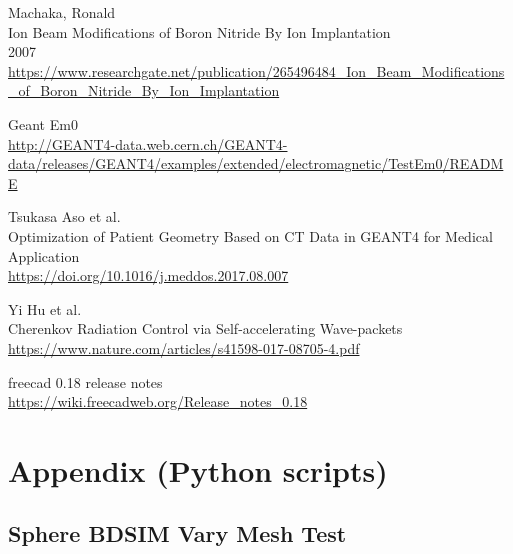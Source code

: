 \documentclass[12pt,a4paper]{article}
\begin{document}
\begin{thebibliography}{1}
	Machaka, Ronald\\
	Ion Beam Modifications of Boron Nitride By Ion Implantation\\
	2007\\
	\url{https://www.researchgate.net/publication/265496484_Ion_Beam_Modifications_of_Boron_Nitride_By_Ion_Implantation}
	
	Geant Em0\\
	\url{http://GEANT4-data.web.cern.ch/GEANT4-data/releases/GEANT4/examples/extended/electromagnetic/TestEm0/README}

	Tsukasa Aso et al.\\
	Optimization of Patient Geometry Based on CT Data in GEANT4 for Medical Application\\
	\url{https://doi.org/10.1016/j.meddos.2017.08.007}

	Yi Hu et al.\\
	Cherenkov Radiation Control via Self-accelerating Wave-packets\\
	\url{https://www.nature.com/articles/s41598-017-08705-4.pdf}

	freecad 0.18 release notes\\
	\url{https://wiki.freecadweb.org/Release_notes_0.18}

\end{thebibliography}

\normalsize
\newpage
\appendix
\section{Appendix (Python scripts)}
\subsection{Sphere BDSIM Vary Mesh Test}
\label{ap1}


%
\end{document}
